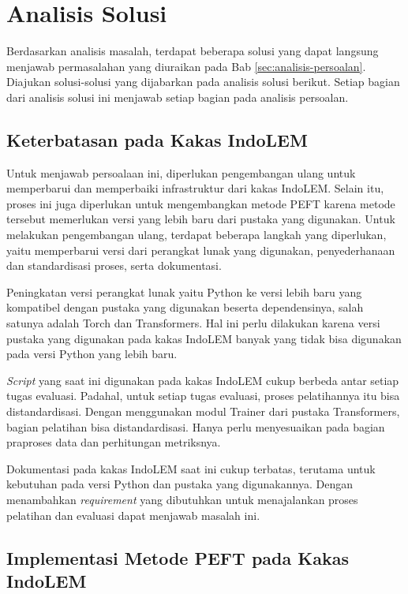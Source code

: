 \section{Analisis Solusi}

Berdasarkan analisis masalah, terdapat beberapa solusi yang dapat langsung menjawab permasalahan yang diuraikan pada Bab \ref{sec:analisis-persoalan}. Diajukan solusi-solusi yang dijabarkan pada analisis solusi berikut. Setiap bagian dari analisis solusi ini  menjawab setiap bagian pada analisis persoalan.

\subsection{Keterbatasan pada Kakas IndoLEM}

Untuk menjawab persoalaan ini, diperlukan pengembangan ulang untuk memperbarui dan memperbaiki infrastruktur dari kakas IndoLEM. Selain itu, proses ini juga diperlukan untuk mengembangkan metode PEFT karena metode tersebut memerlukan versi yang lebih baru dari pustaka yang digunakan. Untuk melakukan pengembangan ulang, terdapat beberapa langkah yang diperlukan, yaitu memperbarui versi dari perangkat lunak yang digunakan, penyederhanaan dan standardisasi proses, serta dokumentasi.

Peningkatan versi perangkat lunak yaitu Python ke versi lebih baru yang kompatibel dengan pustaka yang  digunakan beserta dependensinya, salah satunya adalah Torch dan Transformers. Hal ini perlu dilakukan karena versi pustaka yang digunakan pada kakas IndoLEM banyak yang tidak bisa digunakan pada versi Python yang lebih baru.

\textit{Script} yang saat ini digunakan pada kakas IndoLEM cukup berbeda antar setiap tugas evaluasi. Padahal, untuk setiap tugas evaluasi, proses pelatihannya itu bisa distandardisasi. Dengan menggunakan modul Trainer dari pustaka Transformers, bagian pelatihan bisa distandardisasi. Hanya perlu menyesuaikan pada bagian praproses data dan perhitungan metriksnya.

Dokumentasi pada kakas IndoLEM saat ini cukup terbatas, terutama untuk kebutuhan pada versi Python dan pustaka yang digunakannya. Dengan menambahkan \textit{requirement} yang dibutuhkan untuk menajalankan proses pelatihan dan evaluasi dapat menjawab masalah ini.

\subsection{Implementasi Metode PEFT pada Kakas IndoLEM}


